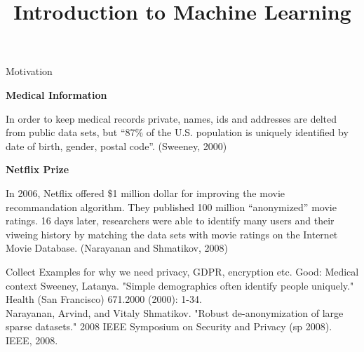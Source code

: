 


\newcommand{\learninggoals}{
\item XXXX
}


\title{Introduction to Machine Learning}
\date{}




\begin{vbframe}{Motivation}
\vfill

\textbf{Medical Information}

In order to keep medical records private, names, ids and addresses are delted from public data sets, but \enquote{87\% of the U.S. population is uniquely identified by date of birth, gender, postal code}. (Sweeney, 2000)

\vfill

\textbf{Netflix Prize}

In 2006, Netflix offered \$1 million dollar for improving the movie recommandation algorithm. They published 100 million \enquote{anonymized} movie ratings. 16 days later, researchers were able to identify many users and their viweing history by matching the data sets with movie ratings on the Internet Movie Database. (Narayanan and Shmatikov, 2008)


\vfill
\begin{tiny}
\begin{singlespace}
Collect Examples for why we need privacy, GDPR, encryption etc.
Good: Medical context
Sweeney, Latanya. "Simple demographics often identify people uniquely." Health (San Francisco) 671.2000 (2000): 1-34.\\
Narayanan, Arvind, and Vitaly Shmatikov. "Robust de-anonymization of large sparse datasets." 2008 IEEE Symposium on Security and Privacy (sp 2008). IEEE, 2008.
\end{singlespace}
\end{tiny}
\end{vbframe}
